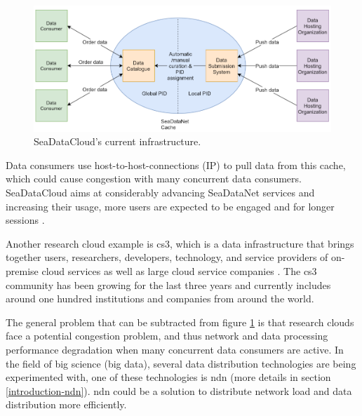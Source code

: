 \begin{figure}[H]
\centering
\includegraphics[scale=0.57]{Images/SDC_current.png}
\caption{SeaDataCloud's current infrastructure.}
\label{fig:sdc_cur}
\end{figure}

Data consumers use host-to-host-connections (IP) to pull data from this cache, which could cause congestion with many concurrent data consumers. SeaDataCloud aims at considerably advancing SeaDataNet services and increasing their usage, more users are expected to be engaged and for longer sessions \cite{sdc-eu}.
 
Another research cloud example is \gls{cs3}, which is a data infrastructure that brings together users, researchers, developers, technology, and service providers of on-premise cloud services as well as large cloud service companies \cite{cs3}. The \gls{cs3} community has been growing for the last three years and currently includes around one hundred institutions and companies from around the world.

The general problem that can be subtracted from figure \ref{fig:sdc_cur} is that research clouds face a potential congestion problem, and thus network and data processing performance degradation when many concurrent data consumers are active. In the field of big science (big data), several data distribution technologies are being experimented with, one of these technologies is \gls{ndn} (more details in section \ref{introduction-ndn}). \gls{ndn} could be a solution to distribute network load and data distribution more efficiently.


